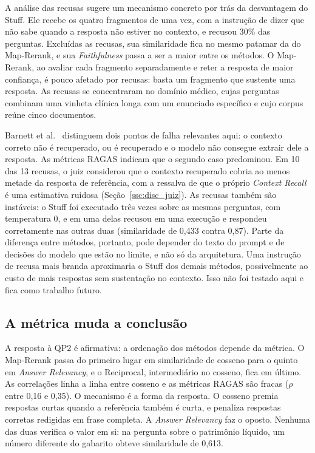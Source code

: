 A análise das recusas sugere um mecanismo concreto por trás da desvantagem do Stuff. Ele recebe os quatro fragmentos de uma vez, com a instrução de dizer que não sabe quando a resposta não estiver no contexto, e recusou 30\% das perguntas. Excluídas as recusas, sua similaridade fica no mesmo patamar da do Map-Rerank, e sua \emph{Faithfulness} passa a ser a maior entre os métodos. O Map-Rerank, ao avaliar cada fragmento separadamente e reter a resposta de maior confiança, é pouco afetado por recusas: basta um fragmento que sustente uma resposta. As recusas se concentraram no domínio médico, cujas perguntas combinam uma vinheta clínica longa com um enunciado específico e cujo corpus reúne cinco documentos.

Barnett et al.~\cite{barnett2024seven} distinguem dois pontos de falha relevantes aqui: o contexto correto não é recuperado, ou é recuperado e o modelo não consegue extrair dele a resposta. As métricas RAGAS indicam que o segundo caso predominou. Em 10 das 13 recusas, o juiz considerou que o contexto recuperado cobria ao menos metade da resposta de referência, com a ressalva de que o próprio \emph{Context Recall} é uma estimativa ruidosa (Seção~\ref{ssc:disc_juiz}). As recusas também são instáveis: o Stuff foi executado três vezes sobre as mesmas perguntas, com temperatura 0, e em uma delas recusou em uma execução e respondeu corretamente nas outras duas (similaridade de 0,433 contra 0,87). Parte da diferença entre métodos, portanto, pode depender do texto do prompt e de decisões do modelo que estão no limite, e não só da arquitetura. Uma instrução de recusa mais branda aproximaria o Stuff dos demais métodos, possivelmente ao custo de mais respostas sem sustentação no contexto. Isso não foi testado aqui e fica como trabalho futuro.

\subsection{A métrica muda a conclusão}

A resposta à QP2 é afirmativa: a ordenação dos métodos depende da métrica. O Map-Rerank passa do primeiro lugar em similaridade de cosseno para o quinto em \emph{Answer Relevancy}, e o Reciprocal, intermediário no cosseno, fica em último. As correlações linha a linha entre cosseno e as métricas RAGAS são fracas ($\rho$ entre 0,16 e 0,35). O mecanismo é a forma da resposta. O cosseno premia respostas curtas quando a referência também é curta, e penaliza respostas corretas redigidas em frase completa. A \emph{Answer Relevancy} faz o oposto. Nenhuma das duas verifica o valor em si: na pergunta sobre o patrimônio líquido, um número diferente do gabarito obteve similaridade de 0,613.

